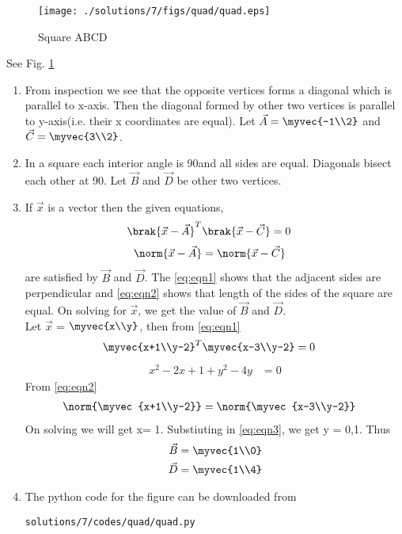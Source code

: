 \begin{figure}[!ht]
\centering
\texttt{[image: ./solutions/7/figs/quad/quad.eps]}
\caption{Square ABCD}
\label{fig:2.2.7}
\end{figure}
See Fig. \ref{fig:2.2.7}

\begin{enumerate}
\item From inspection we see that the opposite vertices forms a diagonal which is parallel to x-axis. Then the diagonal formed by other two vertices is parallel to y-axis(i.e. their x coordinates are equal). Let $\vec{A}= \myvec{-1\\2}$  and $\vec{C}=\myvec{3\\2}$. 

\item In a square each interior angle is 90\degree and all sides are equal. Diagonals bisect each other at 90\degree.
Let $\vec{B}$ and $\vec{D}$ be other two vertices. 

\item If $\vec{x}$ is a vector then the given equations,
\begin{align}
\brak{\vec{x}-\vec{A}}^T\brak{\vec{x}-\vec{C}} &= 0 
\label{eq:eqn1}
\end{align}
\begin{align}
\norm{\vec{x}-\vec{A}} &= \norm{\vec{x}-\vec{C}}
\label{eq:eqn2}
\end{align}
are satisfied by $\vec{B}$ and $\vec{D}$. The \eqref{eq:eqn1} shows that the adjacent sides are perpendicular and \eqref{eq:eqn2} shows that length of the sides of the square are equal. On solving for $\vec{x}$, we get the value of $\vec{B}$ and $\vec{D}$. \\
Let $\vec{x}$ = $\myvec{x\\y}$, then from \eqref{eq:eqn1} 
\begin{align}
\myvec{x+1\\y-2}^T\myvec{x-3\\y-2} &= 0
\end{align}
\begin{align}
x^2 - 2x +1 +y^2 - 4y &= 0
\label{eq:eqn3}
\end{align}
From \eqref{eq:eqn2}
\begin{align}
\norm{\myvec{x+1\\y-2}}&=\norm{\myvec{x-3\\y-2}}
\end{align}
On solving we will get x= 1. Substiuting in \eqref{eq:eqn3}, we get y = 0,1.
Thus 
\begin{align}
\vec{B}&= \myvec{1\\0} \\
\vec{D}&= \myvec{1\\4}
\end{align} 
\item The python code for the figure can be downloaded from
\begin{lstlisting}
solutions/7/codes/quad/quad.py
\end{lstlisting}
\end{enumerate}  
